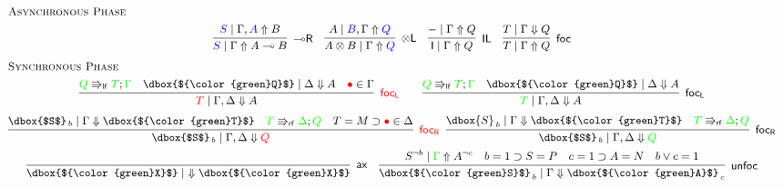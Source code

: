 \documentclass[runningheads]{llncs}
\newcommand{\tl}{\otimes \mathsf{L}}
\newcommand{\lright}{{\multimap}\mathsf{R}}
\newcommand{\unitl}{\mathsf{IL}}
\newcommand{\otL}{\tl}
\newcommand{\lolliR}{\lright}
\newcommand{\IL}{\unitl}
\newcommand{\ax}{\mathsf{ax}}
\newcommand{\ot}{\otimes}
\newcommand{\lolli}{\multimap}
\newcommand{\I}{\mathsf{I}}
\newcommand{\lf}{\Rrightarrow_\mathsf{lf}}
\newcommand{\rf}{\Rrightarrow_\mathsf{rf}}
\newcommand{\red}[1]{{\color{red}#1}}
\newcommand{\blue}[1]{{\color{blue}#1}}
\newcommand{\green}[1]{{\color{green}#1}}
\newcommand{\up}{\Uparrow}
\newcommand{\dn}{\Downarrow}
\newcommand{\focL}{\mathsf{foc_L}}
\newcommand{\foc}{\mathsf{foc}}
\newcommand{\focR}{\mathsf{foc_R}}
\newcommand{\unfoc}{\mathsf{unfoc}}
\begin{document}
\begin{figure}[t]
  \[
  \small
  \begin{array}{c}
    \multicolumn{1}{l}{\text{\textsc{Asynchronous Phase}}} \\[4pt]
      \infer[\lolliR]{\blue{S} \mid \Gamma \up A \lolli B}{\blue{S} \mid \Gamma , \blue{A} \up B}
    \quad
    \infer[\otL]{A \ot B \mid \Gamma \up \blue{Q}}{A\mid  \blue{B} , \Gamma \up \blue{Q}}
    \quad
      \infer[\IL]{\I \mid \Gamma \up Q}{- \mid \Gamma \up Q}    
    \quad
        \infer[\foc]{T \mid \Gamma \up Q}{
      T \mid \Gamma \dn Q
    }
    \\[6pt]
    \multicolumn{1}{l}{\text{\textsc{Synchronous Phase}}} \\[4pt]
        \infer[\red{\focL}]{\red{T} \mid \Gamma , \Delta \dn A}{
          \green{Q} \lf \green{T} ; \green{\Gamma} &
          \dbox{$\green{Q}$} \mid \Delta \dn A
          & \red{\bullet} \in \Gamma
        }
    \qquad
        \infer[\focL]{\green{T} \mid \Gamma , \Delta \dn A}{
          \green{Q} \lf \green{T} ; \green{\Gamma} &
          \dbox{$\green{Q}$} \mid \Delta \dn A
        }
        \\[6pt]
    \infer[\red{\focR}]{\dbox{$S$}_{\, b} \mid \Gamma,\Delta \dn \red{Q}}{
      \dbox{$S$}_{\, b} \mid \Gamma \dn \dbox{$\green{T}$}
      &
      \green{T} \rf \green{\Delta} ; \green{Q}
      & T = M \supset \red{\bullet} \in \Delta
    }
    \;\;
    \infer[\focR]{\dbox{$S$}_{\, b} \mid \Gamma,\Delta \dn \green{Q}}{
      \dbox{S}_{\, b} \mid \Gamma \dn \dbox{$\green{T}$}
      &
      \green{T} \rf \green{\Delta} ; \green{Q}
    }
    \\[4pt]
        \infer[\ax]{\dbox{$\green{X}$} \mid ~ \dn \dbox{$\green{X}$}}{}
    \quad
    \infer[\unfoc]{\dbox{$\green{S}$}_{\,b} \mid \Gamma \dn \dbox{$\green{A}$}_{\,c}}{
      S^{\neg b} \mid \green{\Gamma} \up A^{\neg c}
      &
      b = 1 \supset S = P
      &
      c = 1 \supset A = N
      &
      b \vee c = 1
    }

\end{array}\]
\end{figure}
\end{document}
